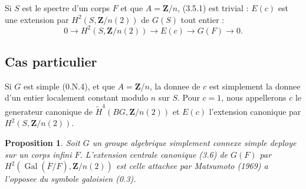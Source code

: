 \documentclass[11pt,a4paper]{article}
\theoremstyle{plain}
\newtheorem{proposition}[theorem]{Proposition}
\theoremstyle{definition}
\DeclareMathOperator{\Gal}{Gal}
\begin{document}
Si $S$ est le spectre d'un corps $F$ et que $A = \mathbf{Z}/n$, (3.5.1) est trivial : $E(c)$ est une extension par $H^2(S, \mathbf{Z}/n(2))$ de $G(S)$ tout entier :
\begin{equation}\label{3.5.4}
0 \to H^2(S, \mathbf{Z}/n(2)) \to E(c) \to G(F) \to 0.
\end{equation}

\subsection{Cas particulier}\label{3.6}

Si $G$ est simple (0.N.4), et que $A = \mathbf{Z}/n$, la donnee de $c$ est simplement la donnee d'un entier localement constant modulo $n$ sur $S$. Pour $c = 1$, nous appellerons $c$ le generateur canonique de $\widetilde{H}^4(BG, \mathbf{Z}/n(2))$ et $E(c)$ l'extension canonique par $H^2(S, \mathbf{Z}/n(2))$.

\begin{proposition}\label{3.7}
Soit $G$ un groupe algebrique simplement connexe simple deploye sur un corps infini $F$. L'extension centrale canonique (3.6) de $G(F)$ par $H^2(\Gal(\overline{F}/F), \mathbf{Z}/n(2))$ est celle attachee par Matsumoto (1969) a l'opposee du symbole galoisien (0.3).
\end{proposition}
\end{document}
